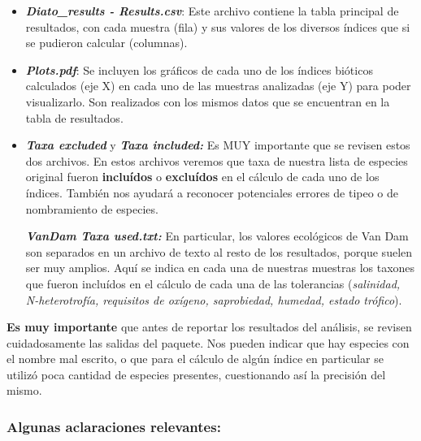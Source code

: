\documentclass[
]{book}
\begin{document}
\begin{itemize}
\item
  \textbf{\emph{Diato\_results - Results.csv}}: Este archivo contiene la tabla principal de resultados, con cada muestra (fila) y sus valores de los diversos índices que si se pudieron calcular (columnas).
\item
  \textbf{\emph{Plots.pdf}}: Se incluyen los gráficos de cada uno de los índices bióticos calculados (eje X) en cada uno de las muestras analizadas (eje Y) para poder visualizarlo. Son realizados con los mismos datos que se encuentran en la tabla de resultados.
\item
  \textbf{\emph{Taxa excluded}} y \textbf{\emph{Taxa included:}} Es MUY importante que se revisen estos dos archivos. En estos archivos veremos que taxa de nuestra lista de especies original fueron \textbf{incluídos} o \textbf{excluídos} en el cálculo de cada uno de los índices. También nos ayudará a reconocer potenciales errores de tipeo o de nombramiento de especies.

  \textbf{\emph{VanDam Taxa used.txt:}} En particular, los valores ecológicos de Van Dam son separados en un archivo de texto al resto de los resultados, porque suelen ser muy amplios. Aquí se indica en cada una de nuestras muestras los taxones que fueron incluídos en el cálculo de cada una de las tolerancias (\emph{salinidad, N-heterotrofía, requisitos de oxígeno, saprobiedad, humedad, estado trófico}).
\end{itemize}

\textbf{Es muy importante} que antes de reportar los resultados del análisis, se revisen cuidadosamente las salidas del paquete. Nos pueden indicar que hay especies con el nombre mal escrito, o que para el cálculo de algún índice en particular se utilizó poca cantidad de especies presentes, cuestionando así la precisión del mismo.

\hypertarget{algunas-aclaraciones-relevantes}{%
\subsubsection{\texorpdfstring{\textbf{Algunas aclaraciones relevantes:}}{Algunas aclaraciones relevantes:}}\label{algunas-aclaraciones-relevantes}}
\end{document}
